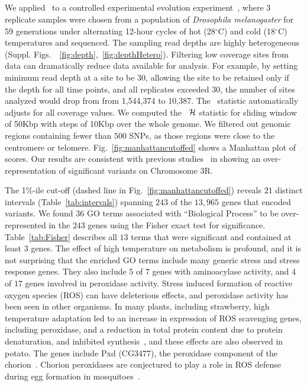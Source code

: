 \subsection{\data}\label{sec:dmel}
We applied \comale\ to a controlled experimental evolution
experiment~\cite{orozco2012adaptation}, where $3$ replicate samples
were chosen from a population of \emph{Drosophila melanogaster} for 59
generations under alternating 12-hour cycles of hot (28$^{\circ}$C)
and cold (18$^{\circ}$C) temperatures and sequenced. The sampling read
depths are highly heterogeneous
(Suppl. Figs.~~\ref{fig:depth},~\ref{fig:depthHetero}). Filtering low
coverage sites from data can dramatically reduce data available for
analysis. For example, by setting minimum read depth at a site to be
$30$, allowing the site to be retained only if the depth for all time
points, and all replicates exceeded $30$, the number of sites analyzed
would drop from from 1,544,374 to 10,387. The \comale\ statistic
automatically adjusts for all coverage values. We computed the
\comale\ ${\cal H}$ statistic for sliding window of 50Kbp with steps
of 10Kbp over the whole genome. We filtered out genomic regions
containing fewer than $500$ SNPs, as those regions were close to the
centromere or telomere. Fig.~\ref{fig:manhattancutoffed} shows a
Manhattan plot of scores. Our results are consistent with previous
studies~\cite{orozco2012adaptation} in showing an over-representation
of significant variants on Chromosome 3R.

The 1\%-ile cut-off (dashed line in Fig.~\ref{fig:manhattancutoffed})
reveals $21$ distinct intervals (Table~\ref{tab:intervals}) spanning
$243$ of the $13,965$ genes that encoded variants. We found $36$ GO
terms associated with ``Biological Process'' to be over-represented in
the $243$ genes using the Fisher exact test for
significance. Table~\ref{tab:Fisher} describes all $13$ terms that
were significant and contained at least $3$ genes. The effect of high
temperature on metabolism is profound, and it is not surprising that
the enriched GO terms include many generic stress and stress response
genes. They also include $5$ of $7$ genes with aminoacylase activity,
and $4$ of $17$ genes involved in peroxidase activity. Stress induced
formation of reactive oxygen species (ROS) can have deleterious
effects, and peroxidase activity has been seen in other organisms. In
many plants, including strawberry, high temperature adaptation led to
an increase in expression of ROS scavenging genes, including
peroxidase, and a reduction in total protein content due to protein
denaturation, and inhibited synthesis~\cite{gulen2004effect}, and
these effects are also observed in potato. The genes include Pxd
(CG3477), the peroxidase component of the
chorion~\cite{konstandi2005enzymatic}. Chorion peroxidases are
conjectured to play a role in ROS defense during egg formation in
mosquitoes~\cite{li2006major}.


